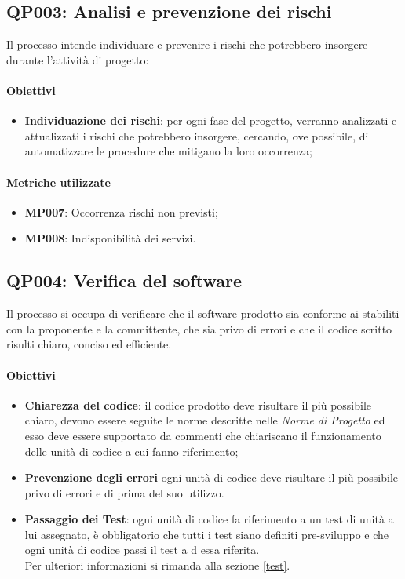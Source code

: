 \subsection{QP003: Analisi e prevenzione dei rischi}
Il processo intende individuare e prevenire i rischi che potrebbero insorgere durante l'attività di progetto:

\paragraph{Obiettivi}
\begin{itemize}
	\item \textbf{Individuazione dei rischi}: per ogni fase del progetto, verranno analizzati e attualizzati i rischi che potrebbero insorgere, cercando, ove possibile, di automatizzare le procedure che mitigano la loro occorrenza;
\end{itemize}

\paragraph{Metriche utilizzate}
\begin{itemize}	
	\item \textbf{MP007}: Occorrenza rischi non previsti;
	\item \textbf{MP008}: Indisponibilità dei servizi.
\end{itemize}
\subsection{QP004: Verifica del software}
Il processo si occupa di verificare che il software prodotto sia conforme ai  stabiliti con la proponente e la committente, che sia privo di errori e che il codice scritto risulti chiaro, conciso ed efficiente.
\paragraph{Obiettivi}
\begin{itemize}
	\item \textbf{Chiarezza del codice}: il codice prodotto deve risultare il più possibile chiaro, devono essere seguite le norme descritte nelle \textit{Norme di Progetto} ed esso deve essere supportato da commenti che chiariscano il funzionamento delle unità di codice a cui fanno riferimento;
	\item \textbf{Prevenzione degli errori} ogni unità di codice deve risultare il più possibile privo di errori e di  prima del suo utilizzo.
	\item \textbf{Passaggio dei Test}: ogni unità di codice fa riferimento a un test di unità a lui assegnato, è obbligatorio che tutti i test siano definiti pre-sviluppo e che ogni unità di codice passi il test a d essa riferita.\\
	Per ulteriori informazioni si rimanda alla sezione \ref{test}.
\end{itemize}
